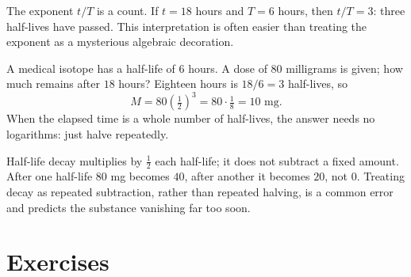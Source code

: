 \documentclass[12pt]{book}
\begin{document}
\begin{center}
\end{center}

The exponent $t/T$ is a count. If $t=18$ hours and $T=6$ hours, then $t/T=3$: three
half-lives have passed. This interpretation is often easier than treating the exponent
as a mysterious algebraic decoration.

\begin{example}
A medical isotope has a half-life of $6$ hours. A dose of $80$ milligrams is given; how
much remains after $18$ hours? Eighteen hours is $18/6=3$ half-lives, so
\[
M=80\left(\tfrac12\right)^{3}=80\cdot\tfrac18=10\text{ mg}.
\]
When the elapsed time is a whole number of half-lives, the answer needs no logarithms:
just halve repeatedly.
\end{example}

\begin{pitfall}
Half-life decay multiplies by $\tfrac12$ each half-life; it does not subtract a fixed
amount. After one half-life $80$ mg becomes $40$, after another it becomes $20$, not
$0$. Treating decay as repeated subtraction, rather than repeated halving, is a common
error and predicts the substance vanishing far too soon.
\end{pitfall}


\section{Exercises}
\end{document}
